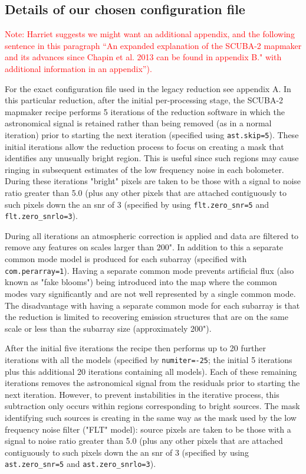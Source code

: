 \documentclass[usenatbib]{mnras}
\newcommand{\note}[1]{\textcolor{red}{Note: #1}}
\begin{document}
\subsection{Details of our chosen configuration file}

\note{Harriet suggests we might want an additional appendix, and the
  following sentence in this paragraph ``An expanded explanation of
  the SCUBA-2 mapmaker and its advances since Chapin et al. 2013 can
  be found in appendix B." with additional information in an
  appendix'').}



For the exact configuration file used in the legacy reduction see
appendix A. In this particular reduction, after the initial
per-processing stage, the SCUBA-2 mapmaker recipe performs 5
iterations of the reduction software in which the astronomical signal
is retained rather than being removed (as in a normal iteration) prior
to starting the next iteration (specified using \texttt{ast.skip=5}). These
initial iterations allow the reduction process to focus on creating a
mask that identifies any unusually bright region. This is useful since
such regions may cause ringing in subsequent estimates of the low
frequency noise in each bolometer. During these iterations "bright"
pixels are taken to be those with a signal to noise ratio greater than
5.0 (plus any other pixels that are attached contiguously to such
pixels down the an snr of 3 (specified by using \texttt{flt.zero\_snr=5} and
\texttt{flt.zero\_snrlo=3}).

During all iterations an atmospheric correction is applied and data
are filtered to remove any features on scales larger than 200". In
addition to this a separate common mode model is produced for each
subarray (specified with \texttt{com.perarray=1}). Having a separate common
mode prevents artificial flux (also known as "fake blooms") being
introduced into the map where the common modes vary significantly and
are not well represented by a single common mode. The disadvantage
with having a separate common mode for each subarray is that the
reduction is limited to recovering emission structures that are on the
same scale or less than the subarray size (approximately 200").

After the initial five iterations the recipe then performs up to 20
further iterations with all the models (specified by
\texttt{numiter=-25}; the initial 5 iterations plus this additional 20
iterations containing all models). Each of these remaining iterations
removes the astronomical signal from the residuals prior to starting
the next iteration. However, to prevent instabilities in the iterative
process, this subtraction only occurs within regions corresponding to
bright sources.  The mask identifying such sources is creating in the
same way as the mask used by the low frequency noise filter ("FLT"
model): source pixels are taken to be those with a signal to noise
ratio greater than 5.0 (plus any other pixels that are attached
contiguously to such pixels down the an snr of 3 (specified by using
\texttt{ast.zero\_snr=5} and \texttt{ast.zero\_snrlo=3}).
\end{document}
